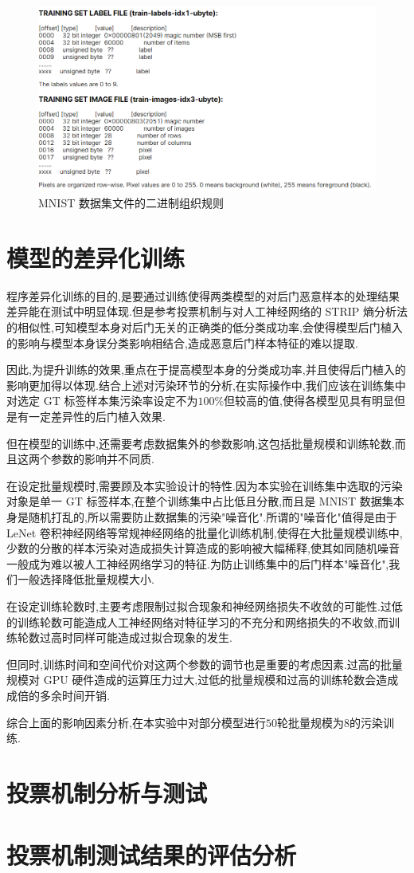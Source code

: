 \begin{figure}[H]
	\centering
	\includegraphics[scale=0.5]{Figures/rule.png}
	\caption{MNIST 数据集文件的二进制组织规则}
\end{figure}

\section{模型的差异化训练}

程序差异化训练的目的,是要通过训练使得两类模型的对后门恶意样本的处理结果差异能在测试中明显体现.但是参考投票机制与对人工神经网络的 STRIP 熵分析法的相似性,可知模型本身对后门无关的正确类的低分类成功率,会使得模型后门植入的影响与模型本身误分类影响相结合,造成恶意后门样本特征的难以提取.

因此,为提升训练的效果,重点在于提高模型本身的分类成功率,并且使得后门植入的影响更加得以体现.结合上述对污染环节的分析,在实际操作中,我们应该在训练集中对选定 GT 标签样本集污染率设定不为$100\%$但较高的值,使得各模型见具有明显但是有一定差异性的后门植入效果.

但在模型的训练中,还需要考虑数据集外的参数影响,这包括批量规模和训练轮数,而且这两个参数的影响并不同质.

在设定批量规模时,需要顾及本实验设计的特性.因为本实验在训练集中选取的污染对象是单一 GT 标签样本,在整个训练集中占比低且分散,而且是 MNIST 数据集本身是随机打乱的,所以需要防止数据集的污染"噪音化".所谓的"噪音化"值得是由于 LeNet 卷积神经网络等常规神经网络的批量化训练机制,使得在大批量规模训练中,少数的分散的样本污染对造成损失计算造成的影响被大幅稀释,使其如同随机噪音一般成为难以被人工神经网络学习的特征.为防止训练集中的后门样本"噪音化",我们一般选择降低批量规模大小.

在设定训练轮数时,主要考虑限制过拟合现象和神经网络损失不收敛的可能性.过低的训练轮数可能造成人工神经网络对特征学习的不充分和网络损失的不收敛,而训练轮数过高时同样可能造成过拟合现象的发生.

但同时,训练时间和空间代价对这两个参数的调节也是重要的考虑因素.过高的批量规模对 GPU 硬件造成的运算压力过大,过低的批量规模和过高的训练轮数会造成成倍的多余时间开销.

综合上面的影响因素分析,在本实验中对部分模型进行$50$轮批量规模为$8$的污染训练.

\section{投票机制分析与测试}

\section{投票机制测试结果的评估分析}
